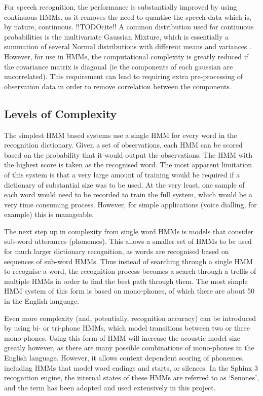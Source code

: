 	For speech recognition, the performance is substantially improved by using continuous HMMs, as it removes the need to quantise the speech data which is, by nature, continuous. !!TODOcite!!  A common  distribution used for continuous probabilities is the multivariate Gaussian Mixture, which is essentially a summation of several Normal distributions with different means and variances \cite{bilmes2006hmms}.  However, for use in HMMs, the computational complexity is greatly reduced if the covariance matrix is diagonal (ie the components of each gaussian are uncorrelated).  This requirement can lead to requiring extra pre-processing of observation data in order to remove correlation between the components.

	\subsection{Levels of Complexity} %
	\label{sub:levels_of_complexity}
		The simplest HMM based systems use a single HMM for every word in the recognition dictionary.  Given a set of observations, each HMM can be scored based on the probability that it would output the observations.  The HMM with the highest score is taken as the recognised word.  The most apparent limitation of this system is that a very large amount of training would be required if a dictionary of substantial size was to be used.  At the very least, one sample of each word would need to be recorded to train the full system, which would be a very time consuming process.  However, for simple applications (voice dialling, for example) this is manageable.

		The next step up in complexity from single word HMMs is models that consider sub-word utterances (phonemes).  This allows a smaller set of HMMs to be used for much larger dictionary recognition, as words are recognised based on sequences of sub-word HMMs.  Thus instead of searching through a single HMM to recognise a word, the recognition process becomes a search through a trellis of multiple HMMs in order to find the best path through them.  The most simple HMM system of this form is based on mono-phones, of which there are about 50 in the English language.

		Even more complexity (and, potentially, recognition accuracy) can be introduced by using bi- or tri-phone HMMs, which model transitions between two or three mono-phones.  Using this form of HMM will increase the acoustic model size greatly however, as there are many possible combinations of mono-phones in the English language.  However, it allows context dependent scoring of phonemes, including HMMs that model word endings and starts, or silences.  In the Sphinx 3 recognition engine, the internal states of these HMMs are referred to as `Senones', and the term has been adopted and used extensively in this project.

